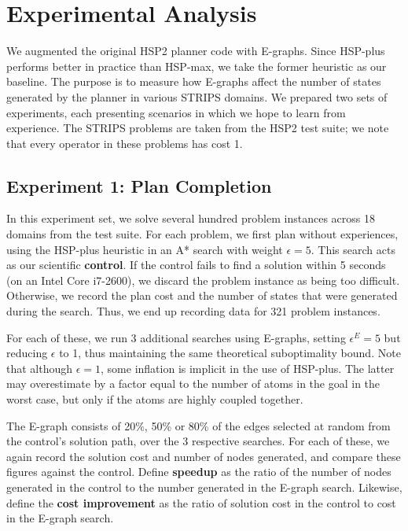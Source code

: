 \documentclass[letterpaper]{article}
\begin{document}
\section{Experimental Analysis}

We augmented the original HSP2 planner code \cite{bonet2001planning} with E-graphs.
Since HSP-plus performs better in practice than HSP-max, we take the former heuristic as our baseline.
The purpose is to measure how E-graphs affect the number of states generated by the planner in various STRIPS domains.
We prepared two sets of experiments, each presenting scenarios in which we hope to learn from experience.
The STRIPS problems are taken from the HSP2 test suite; we note that every operator in these problems has cost 1.

\subsection{Experiment 1: Plan Completion}

In this experiment set, we solve several hundred problem instances across 18 domains from the test suite.
For each problem, we first plan without experiences, using the HSP-plus heuristic in an A* search with weight $\epsilon=5$.
This search acts as our scientific \textbf{control}.
If the control fails to find a solution within 5 seconds (on an Intel Core i7-2600), we discard the problem instance as being too difficult.
Otherwise, we record the plan cost and the number of states that were generated during the search.
Thus, we end up recording data for 321 problem instances.

For each of these, we run 3 additional searches using E-graphs, setting $\epsilon^E=5$ but reducing $\epsilon$ to 1, thus maintaining the same theoretical suboptimality bound.
Note that although $\epsilon = 1$, some inflation is implicit in the use of HSP-plus.
The latter may overestimate by a factor equal to the number of atoms in the goal in the worst case, but only if the atoms are highly coupled together.

The E-graph consists of 20\%, 50\% or 80\% of the edges selected at random from the control's solution path, over the 3 respective searches. For each of these, we again record the solution cost and number of nodes generated, and compare these figures against the control.
Define \textbf{speedup} as the ratio of the number of nodes generated in the control to the number generated in the E-graph search.
Likewise, define the \textbf{cost improvement} as the ratio of solution cost in the control to cost in the E-graph search.
\end{document}
